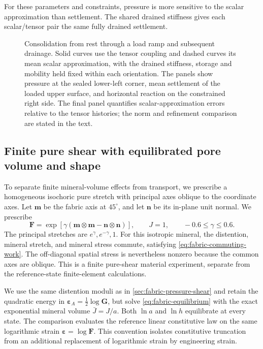 
For these parameters and constraints, pressure is more sensitive to the
scalar approximation than settlement. The shared drained stiffness gives
each scalar/tensor pair the same fully drained settlement.

\begin{figure}[htbp]
 \centering
 \caption{Consolidation from rest through a load ramp and subsequent
 drainage. Solid curves use the tensor coupling and dashed curves its
 mean scalar approximation, with the drained stiffness, storage and
 mobility held fixed within each orientation. The panels show pressure
 at the sealed lower-left corner, mean settlement of the loaded upper surface, and
 horizontal reaction on the constrained right side. The final panel
 quantifies scalar-approximation errors relative to the tensor histories;
 the norm and refinement comparison are stated in the text.}
 \label{fig:fe-fabric-mandel}
\end{figure}

\subsection{Finite pure shear with equilibrated pore volume and shape}
\label{sec:fabric-finite-benchmark}

To separate finite mineral-volume effects from transport, we prescribe a
homogeneous isochoric pure stretch with principal axes oblique to the
coordinate axes. Let \(\mathbf m\) be the fabric axis at
\(45^\circ\), and let \(\mathbf n\) be its in-plane unit normal.
We prescribe
\begin{equation}
 \mathbf F=\exp\left[\gamma
       (\mathbf m\otimes\mathbf m-\mathbf n\otimes\mathbf n)\right],
 \qquad J=1,
 \qquad -0.6\le\gamma\le0.6.
 \label{eq:fabric-finite-pure-shear}
\end{equation}
The principal stretches are \(e^\gamma,e^{-\gamma},1\). For this
isotropic mineral, the distention, mineral stretch, and mineral stress
commute, satisfying \eqref{eq:fabric-commuting-work}. The off-diagonal
spatial stress is nevertheless nonzero because the common axes are
oblique. This is a finite pure-shear material experiment, separate from
the reference-state finite-element calculations.

We use the same distention moduli as in
\cref{sec:fabric-pressure-shear} and retain the quadratic energy in
\(\mathbf\varepsilon_A=\tfrac12\log\mathbf G\), but solve
\eqref{eq:fabric-equilibrium} with the exact exponential mineral volume
\(\bar J=J/a\). Both \(\ln a\) and \(\ln h\) equilibrate at every
state. The comparison evaluates the reference linear constitutive law
on the same logarithmic strain \(\mathbf\varepsilon=\log\mathbf F\).
This convention isolates constitutive truncation from an additional
replacement of logarithmic strain by engineering strain.

